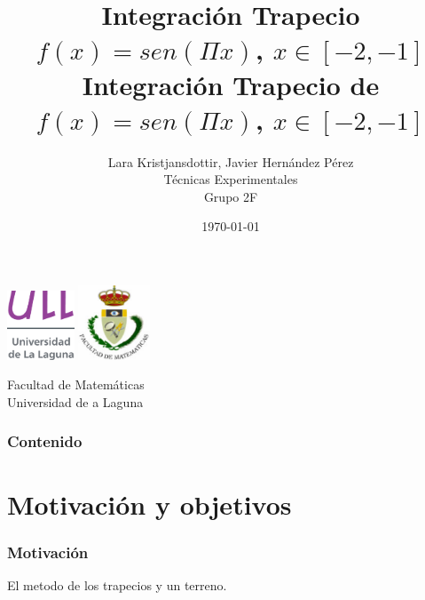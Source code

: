 \documentclass{beamer}
\title{Integración Trapecio \\ $f(x)=sen(\Pi x)$, $x \in [-2,-1]$}
\author{Lara Kristjansdottir, Javier Hernández Pérez\\ Técnicas Experimentales \\ Grupo 2F}
\date{\today}
\begin{document}
\begin{frame}
  \includegraphics[width=0.15\textwidth]{img/ullesc.eps}
  \hspace*{7.5cm}
  \includegraphics[width=0.16\textwidth]{img/fmatesc.eps}
  \titlepage
  \begin{scriptsize}
    \begin{center}
    \title{Integración Trapecio de $f(x)=sen(\Pi x)$, $x \in [-2,-1]$}
      Facultad de Matemáticas \\Universidad de a Laguna
    \end{center}
  \end{scriptsize}
\end{frame}
\begin{frame}
  \frametitle{Contenido}
  \tableofcontents
\end{frame} 
\section{Motivación y objetivos}
\begin{frame}
\frametitle{Motivación}
El metodo de los trapecios y un terreno.
\end{frame}
\end{document}
